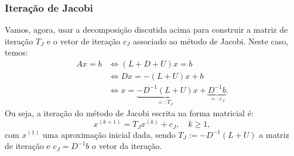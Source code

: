 \subsubsection{Iteração de Jacobi}

Vamos, agora, usar a decomposição discutida acima para construir a matriz de iteração $T_J$ e o vetor de iteração $c_J$ associado ao método de Jacobi. Neste caso, temos:
\begin{align*}
  Ax = b &\Leftrightarrow (L + D + U)x = b\\
  &\Leftrightarrow Dx = -(L+U)x + b\\
  &\Leftrightarrow x = \underbrace{-D^{-1}(L+U)}_{=: T_J}x + \underbrace{D^{-1}b}_{=: c_J}.
\end{align*}
Ou seja, a iteração do método de Jacobi escrita na forma matricial é:
\begin{equation*}
  x^{(k+1)} = T_Jx^{(k)} + c_J,\quad k\geq 1,
\end{equation*}
com $x^{(1)}$ uma aproximação inicial dada, sendo $T_J := -D^{-1}(L+U)$ a matriz de iteração e $c_J = D^{-1}b$ o vetor da iteração.


